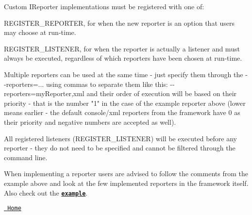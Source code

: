 Custom {\ttfamily IReporter} implementations must be registered with one of\+:


\begin{DoxyItemize}
\item {\ttfamily REGISTER\+\_\+\+REPORTER}, for when the new reporter is an option that users may choose at run-\/time.
\item {\ttfamily REGISTER\+\_\+\+LISTENER}, for when the reporter is actually a listener and must always be executed, regardless of which reporters have been chosen at run-\/time.
\end{DoxyItemize}

Multiple reporters can be used at the same time -\/ just specify them through the {\ttfamily -\/-\/reporters=...}  using commas to separate them like this\+: {\ttfamily -\/-\/reporters=my\+Reporter,xml} and their order of execution will be based on their priority -\/ that is the number "{}1"{} in the case of the example reporter above (lower means earlier -\/ the default console/xml reporters from the framework have 0 as their priority and negative numbers are accepted as well).

All registered listeners ({\ttfamily REGISTER\+\_\+\+LISTENER}) will be executed before any reporter -\/ they do not need to be specified and cannot be filtered through the command line.

When implementing a reporter users are advised to follow the comments from the example above and look at the few implemented reporters in the framework itself. Also check out the \href{../../examples/all_features/reporters_and_listeners.cpp}{\texttt{ {\bfseries{example}}}}.



\href{readme.md\#reference}{\texttt{ Home}}



